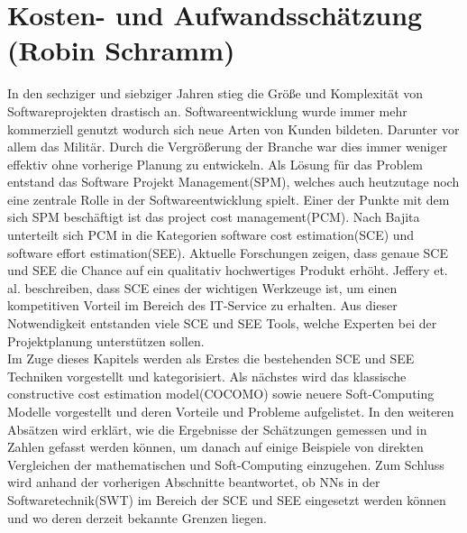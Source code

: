\section{Kosten- und Aufwandsschätzung (Robin Schramm)} \label{KostenAufwand}
In den sechziger und siebziger Jahren stieg die Größe und Komplexität von Softwareprojekten drastisch an. Softwareentwicklung wurde immer mehr kommerziell genutzt wodurch sich neue Arten von Kunden bildeten. Darunter vor allem das Militär. Durch die Vergrößerung der Branche war dies immer weniger effektiv ohne vorherige Planung zu entwickeln. Als Lösung für das Problem entstand das Software Projekt Management(SPM), welches auch heutzutage noch eine zentrale Rolle in der Softwareentwicklung spielt.\cite{Bajta2018} Einer der Punkte mit dem sich SPM beschäftigt ist das project cost management(PCM). Nach Bajita\cite{Bajta2018} unterteilt sich PCM in die Kategorien software cost estimation(SCE) und software effort estimation(SEE). Aktuelle Forschungen zeigen, dass genaue SCE und SEE die Chance auf ein qualitativ hochwertiges Produkt erhöht.\cite{Matson1994}\cite{Bilgaiyan2016} Jeffery et. al. beschreiben, dass SCE eines der wichtigen Werkzeuge ist, um einen kompetitiven Vorteil im Bereich des IT-Service zu erhalten.\cite{Jeffery1990} Aus dieser Notwendigkeit entstanden viele SCE und SEE Tools, welche Experten bei der Projektplanung unterstützen sollen.
\\
Im Zuge dieses Kapitels werden als Erstes die bestehenden SCE und SEE Techniken vorgestellt und kategorisiert. Als nächstes wird das klassische constructive cost estimation model(COCOMO) sowie neuere Soft-Computing Modelle vorgestellt und deren Vorteile und Probleme aufgelistet. In den weiteren Absätzen wird erklärt, wie die Ergebnisse der Schätzungen gemessen und in Zahlen  gefasst werden können, um danach auf einige Beispiele von direkten Vergleichen der mathematischen und Soft-Computing einzugehen. Zum Schluss wird anhand der vorherigen Abschnitte beantwortet, ob NNs in der Softwaretechnik(SWT) im Bereich der SCE und SEE eingesetzt werden können und wo deren derzeit bekannte Grenzen liegen.

